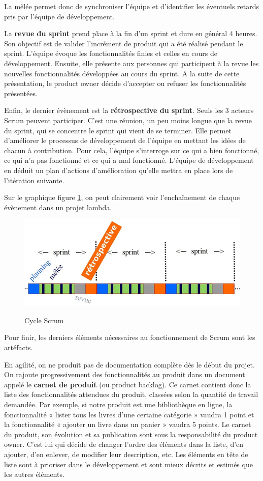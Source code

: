 \documentclass[12pt]{report}
\begin{document}
La mêlée permet donc de synchroniser l'équipe et d'identifier les éventuels retards pris par l'équipe de développement.

La \textbf{revue du sprint} prend place à la fin d'un sprint et dure en général 4 heures. Son objectif est de valider l'incrément de produit qui a été réalisé pendant le sprint.
L'équipe évoque les fonctionnalités finies et celles en cours de développement. Ensuite, elle présente aux personnes qui participent à la revue les nouvelles fonctionnalités développées au cours du sprint.
A la suite de cette présentation, le product owner décide d'accepter ou refuser les fonctionnalités présentées\cite{wikiscrum}.

Enfin, le dernier évènement est la \textbf{rétrospective du sprint}. Seuls les 3 acteurs Scrum peuvent participer. C'est une réunion, un peu moins longue que la revue du sprint, qui se concentre le sprint qui vient de se terminer. Elle permet d'améliorer le processus de développement de l'équipe en mettant les idées de chacun à contribution. Pour cela, l'équipe s'interroge sur ce qui a bien fonctionné, ce qui n'a pas fonctionné et ce qui a mal fonctionné\cite{gitagile}. L'équipe de développement en déduit un plan d'actions d'amélioration qu'elle mettra en place lors de l'itération suivante.

Sur le graphique figure \ref{fig:scrum}, on peut clairement voir l'enchaînement de chaque évènement dans un projet lambda.
\begin{figure}[htp]
  \centering
  \includegraphics[scale=0.8]{images/events_scrum}\cite{agiscrum}
  \caption{Cycle Scrum}
  \label{fig:scrum}
\end{figure}

Pour finir, les derniers éléments nécessaires au fonctionnement de Scrum sont les artéfacts.

En agilité, on ne produit pas de documentation complète dès le début du projet. On rajoute progressivement des fonctionnalités au produit dans un document appelé le \textbf{carnet de produit} (ou product backlog)\cite{wikiscrum}. Ce carnet contient donc la liste des fonctionnalités attendues du produit, classées selon la quantité de travail demandée. Par exemple, si notre produit est une bibliothèque en ligne, la fonctionnalité « lister tous les livres d'une certaine catégorie » vaudra 1 point et la fonctionnalité « ajouter un livre dans un panier » vaudra 5 points. Le carnet du produit, son évolution et sa publication sont sous la responsabilité du product owner. C'est lui qui décide de changer l'ordre des éléments dans la liste, d'en ajouter, d'en enlever, de modifier leur description, etc. Les éléments en tête de liste sont à prioriser dans le développement et sont mieux décrits et estimés que les autres éléments.
\end{document}
